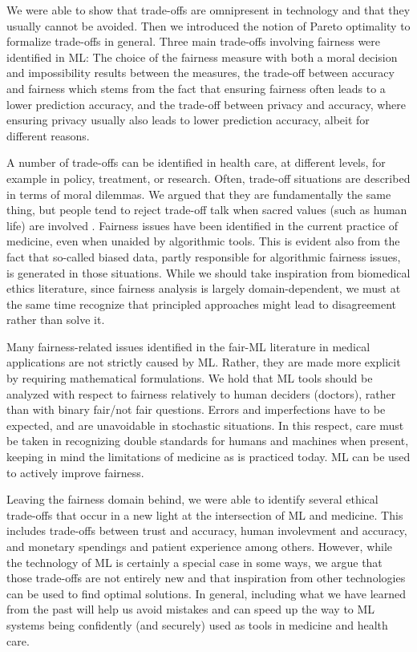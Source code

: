We were able to show that trade-offs are omnipresent in technology and that they usually cannot be avoided.
Then we introduced the notion of Pareto optimality to formalize trade-offs in general.
Three main trade-offs involving fairness were identified in ML: The choice of the fairness measure with both a moral decision and impossibility results between the measures, the trade-off between accuracy and fairness which stems from the fact that ensuring fairness often leads to a lower prediction accuracy, and the trade-off between privacy and accuracy, where ensuring privacy usually also leads to lower prediction accuracy, albeit for different reasons.

A number of trade-offs can be identified in health care, at different levels, for example in policy, treatment, or research.
Often, trade-off situations are described in terms of moral dilemmas. We argued that they are fundamentally the same thing, but people tend to reject trade-off talk when sacred values (such as human life) are involved \cite{Tetlock2003}.
Fairness issues have been identified in the current practice of medicine, even when unaided by algorithmic tools. This is evident also from the fact that so-called biased data, partly responsible for algorithmic fairness issues, is generated in those situations.
While we should take inspiration from biomedical ethics literature, since fairness analysis is largely domain-dependent, we must at the same time recognize that principled approaches might lead to disagreement rather than solve it.

Many fairness-related issues identified in the fair-ML literature in medical applications are not strictly caused by ML. Rather, they are made more explicit by requiring mathematical formulations.
We hold that ML tools should be analyzed with respect to fairness relatively to human deciders (doctors), rather than with binary fair/not fair questions. Errors and imperfections have to be expected, and are unavoidable in stochastic situations. In this respect, care must be taken in recognizing double standards for humans and machines when present, keeping in mind the limitations of medicine as is practiced today.
ML can be used to actively improve fairness.

Leaving the fairness domain behind, we were able to identify several ethical trade-offs that occur in a new light at the intersection of ML and medicine. This includes trade-offs between trust and accuracy, human involevment and accuracy, and monetary spendings and patient experience among others. However, while the technology of ML is certainly a special case in some ways, we argue that those trade-offs are not entirely new and that inspiration from other technologies can be used to find optimal solutions. In general, including what we have learned from the past will help us avoid mistakes and can speed up the way to ML systems being confidently (and securely) used as tools in medicine and health care.